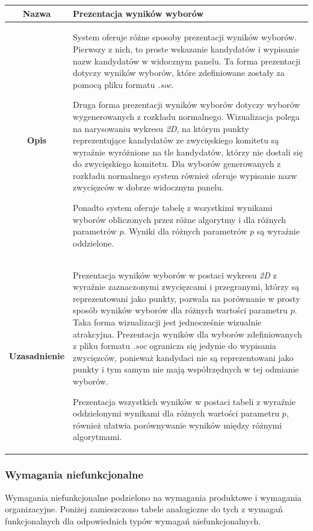 \documentclass[polish,11pt]{aghthesis}
\begin{document}
{
\centering
\begin{tabular}{|c|p{10cm}|}
\hline
\textbf{Nazwa} & Prezentacja wyników wyborów \\ 
\hline 
\textbf{Opis} & System oferuje różne sposoby prezentacji wyników wyborów. Pierwszy z
nich, to proste wskazanie kandydatów i wypisanie nazw kandydatów w
widocznym panelu. Ta forma prezentacji dotyczy wyników wyborów,
które zdefiniowane zostały za pomocą pliku formatu \textit{.soc}.

Druga forma prezentacji wyników wyborów dotyczy wyborów wygenerowanych z
rozkładu normalnego. Wizualizacja polega na narysowaniu wykresu
\textit{2D}, na którym punkty reprezentujące kandydatów ze zwycięskiego
komitetu są wyraźnie wyróżnione na tle kandydatów, którzy nie dostali
się do zwycięskiego komitetu. Dla wyborów generowanych z rozkładu normalnego system również oferuje wypisanie nazw zwycięzców w dobrze widocznym panelu.

Ponadto system oferuje tabelę z wszystkimi wynikami wyborów obliczonych przez różne algorytmy i dla różnych parametrów $p$. Wyniki dla różnych parametrów $p$ są wyraźnie oddzielone.\\ 
\hline 
\textbf{Uzasadnienie} & Prezentacja wyników wyborów w postaci wykresu \textit{2D} z wyraźnie
zaznaczonymi zwycięzcami i przegranymi, którzy są reprezentowani
jako punkty, pozwala na porównanie w prosty sposób wyników
wyborów dla różnych wartości parametru $p$. Taka forma wizualizacji
jest jednocześnie wizualnie atrakcyjna.
Prezentacja wyników dla wyborów zdefiniowanych z pliku formatu \textit{.soc}
ogranicza się jedynie do wypisania zwycięzców, ponieważ kandydaci
nie są reprezentowani jako punkty i tym samym nie mają
współrzędnych w tej odmianie wyborów.

Prezentacja wszystkich wyników w postaci tabeli z wyraźnie oddzielonymi wynikami dla różnych wartości parametru $p$, również ułatwia porównywanie wyników między różnymi algorytmami.\\ 
\hline 
\end{tabular} 
}

\clearpage
\subsubsection{Wymagania niefunkcjonalne}
Wymagania niefunkcjonalne podzielono na wymagania produktowe i wymagania organizacyjne. Poniżej zamieszczono tabele analogiczne do tych z wymagań funkcjonalnych dla odpowiednich typów wymagań niefunkcjonalnych.
\end{document}

